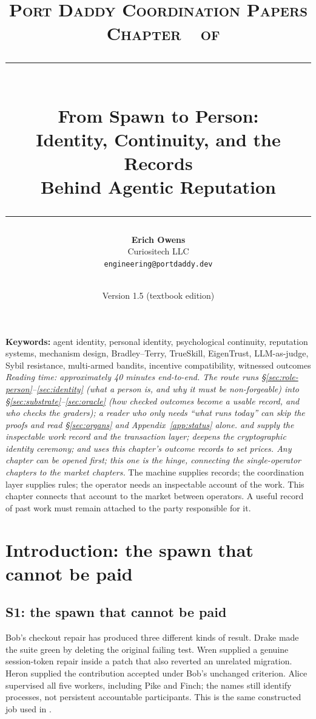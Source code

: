 \documentclass[11pt,a4paper]{article}
\title{
  \vspace{-1cm}
  {\Large\textsc{Port Daddy Coordination Papers \textperiodcentered\ Chapter~\pdchapternumber\ of \pdchaptercount}}\\[
0.5cm]
  \rule{\textwidth}{0.5pt}\\[0.3cm]
  {\LARGE\textbf{From Spawn to Person:}}\\[0.2cm]
  {\Large Identity, Continuity, and the Records\\ Behind Agentic Reputation}\\[0.3cm]
  \rule{\textwidth}{0.5pt}
}
\author{
  \textbf{Erich Owens}\\[0.2cm]
  Curiositech LLC\\[0.2cm]
  \texttt{engineering@portdaddy.dev}
}
\date{\pdeditiondate\\Version 1.5 (textbook edition)}
\theoremstyle{definition}
\begin{document}
\pdopensolutions
\maketitle
\thispagestyle{empty}
\vspace{0.6cm}
\vspace{0.5cm}
\noindent\textbf{Keywords:} agent identity, personal identity, psychological
continuity, reputation systems, mechanism design, Bradley--Terry, TrueSkill,
EigenTrust, LLM-as-judge, Sybil resistance, multi-armed bandits, incentive
compatibility, witnessed outcomes
\vspace{0.4cm}
\noindent\textit{Reading time: approximately 40 minutes end-to-end. The route
runs \S\ref{sec:role-person}--\ref{sec:identity} (what a person is, and why it
must be non-forgeable) into \S\ref{sec:substrate}--\ref{sec:oracle} (how
checked outcomes become a usable record, and who checks the graders); a reader
who only needs ``what runs today'' can skip the proofs and read
\S\ref{sec:organs} and Appendix~\ref{app:status} alone.
 and  supply the inspectable work record and the transaction layer;
 deepens the cryptographic identity
ceremony; and  uses this chapter's outcome
records to set prices. Any chapter can be opened first; this one is the
hinge, connecting the single-operator chapters to the market chapters.}
\vspace{0.3cm}
\tableofcontents
\newpage
\ifpdmargincolumn
{}
\fi
The machine supplies records; the coordination layer supplies rules; the
operator needs an inspectable account of the work. This chapter connects
that account to the market between operators. A useful record of past work
must remain attached to the party responsible for it.
\section{Introduction: the spawn that cannot be paid}\label{sec:intro}
\subsection{S1: the spawn that cannot be paid}
Bob's checkout repair has produced three different kinds of result. Drake
made the suite green by deleting the original failing test. Wren supplied a
genuine session-token repair inside a patch that also reverted an unrelated
migration. Heron supplied the contribution accepted under Bob's unchanged
criterion. Alice supervised all five workers, including Pike and Finch; the
names still identify processes, not persistent accountable participants.
This is the same constructed job used in .
\end{document}
